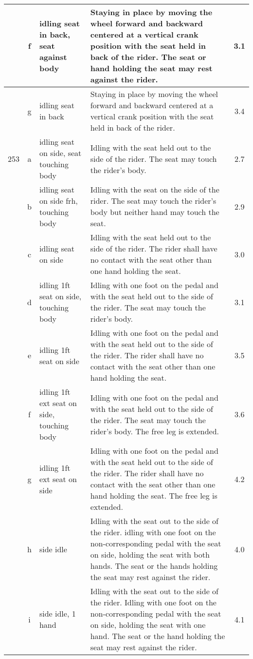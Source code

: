 \begin{longtable}{|r|c|p{4cm}|p{8cm}|c|}
\hline
  & f & idling seat in back, seat against body  & Staying in place by moving the wheel forward and backward centered at a vertical crank position with the seat held in back of the rider. The seat or hand holding the seat may rest against the rider.  & 3.1 \\ 
\hline
  & g & idling seat in back & Staying in place by moving the wheel forward and backward centered at a vertical crank position with the seat held in back of the rider.  & 3.4 \\ 
\hline
253 & a & idling seat on side, seat touching body & Idling with the seat held out to the side of the rider. The seat may touch the rider’s body.  & 2.7 \\ 
\hline
  & b & idling seat on side frh, touching body  & Idling with the seat on the side of the rider. The seat may touch the rider’s body but neither hand may touch the seat. & 2.9 \\ 
\hline
  & c & idling seat on side & Idling with the seat held out to the side of the rider. The rider shall have no contact with the seat other than one hand holding the seat. & 3.0 \\ 
\hline
  & d & idling 1ft seat on side, touching body  & Idling with one foot on the pedal and with the seat held out to the side of the rider. The seat may touch the rider’s body. & 3.1 \\ 
\hline
  & e & idling 1ft seat on side & Idling with one foot on the pedal and with the seat held out to the side of the rider. The rider shall have no contact with the seat other than one hand holding the seat.  & 3.5 \\ 
\hline
  & f & idling 1ft ext seat on side, touching body  & Idling with one foot on the pedal and with the seat held out to the side of the rider. The seat may touch the rider’s body. The free leg is extended. & 3.6 \\ 
\hline
  & g & idling 1ft ext seat on side & Idling with one foot on the pedal and with the seat held out to the side of the rider. The rider shall have no contact with the seat other than one hand holding the seat. The free leg is extended.  & 4.2 \\ 
\hline
  & h & side idle & Idling with the seat out to the side of the rider. idling with one foot on the non-corresponding pedal with the seat on side, holding the seat with both hands. The seat or the hands holding the seat may rest against the rider.  & 4.0 \\ 
\hline
  & i & side idle, 1 hand & Idling with the seat out to the side of the rider. Idling with one foot on the non-corresponding pedal with the seat on side, holding the seat with one hand. The seat or the hand holding the seat may rest against the rider. & 4.1 \\ 

\end{longtable}
